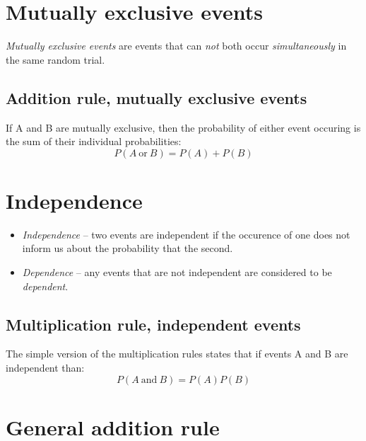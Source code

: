 \documentclass[]{book}
\theoremstyle{definition}
\theoremstyle{definition}
\theoremstyle{definition}
\theoremstyle{remark}
\begin{document}
\hypertarget{mutually-exclusive-events}{%
\section{Mutually exclusive events}\label{mutually-exclusive-events}}

\emph{Mutually exclusive events} are events that can \emph{not} both
occur \emph{simultaneously} in the same random trial.

\hypertarget{addition-rule-mutually-exclusive-events}{%
\subsection{Addition rule, mutually exclusive
events}\label{addition-rule-mutually-exclusive-events}}

If A and B are mutually exclusive, then the probability of either event
occuring is the sum of their individual probabilities: \[
P(A\ \text{or}\ B) = P(A) + P(B)
\]

\hypertarget{independence}{%
\section{Independence}\label{independence}}

\begin{itemize}
\item
  \emph{Independence} -- two events are independent if the occurence of
  one does not inform us about the probability that the second.
\item
  \emph{Dependence} -- any events that are not independent are
  considered to be \emph{dependent}.
\end{itemize}

\hypertarget{multiplication-rule-independent-events}{%
\subsection{Multiplication rule, independent
events}\label{multiplication-rule-independent-events}}

The simple version of the multiplication rules states that if events A
and B are independent than: \[
P(A\ \text{and}\ B) = P(A)P(B) 
\]

\hypertarget{general-addition-rule}{%
\section{General addition rule}\label{general-addition-rule}}
\end{document}
